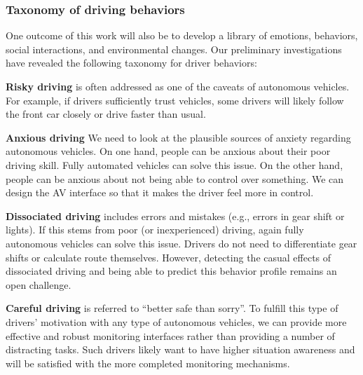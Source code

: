 \subsubsection{Taxonomy of driving behaviors}
One outcome of this work will also be to develop a library of emotions, behaviors, social interactions, and environmental changes. 
Our preliminary investigations have revealed the following taxonomy for driver behaviors:

\noindent \textbf{Risky driving} is often addressed as one of the caveats of autonomous vehicles. For example, if drivers sufficiently trust vehicles, some drivers will likely follow the front car closely or drive faster than usual. 

\noindent \textbf{Anxious driving} We need to look at the plausible sources of anxiety regarding autonomous vehicles. On one hand, people can be anxious about their poor driving skill. Fully automated vehicles can solve this issue. On the other hand, people can be anxious about not being able to control over something. We can design the AV interface so that it makes the driver feel more in control.

\noindent \textbf{Dissociated driving} includes errors and mistakes (e.g., errors in gear shift or lights). If this stems from poor (or inexperienced) driving, again fully autonomous vehicles can solve this issue. Drivers do not need to differentiate gear shifts or calculate route themselves. However, detecting the casual effects of dissociated driving and being able to predict this behavior profile remains an open challenge.


\noindent \textbf{Careful driving} is referred to ``better safe than sorry''. 
To fulfill this type of drivers' motivation with any type of autonomous vehicles, we can provide more effective and robust monitoring interfaces rather than providing a number of distracting tasks. Such drivers likely want to have higher situation awareness and will be satisfied with the more completed monitoring mechanisms.

